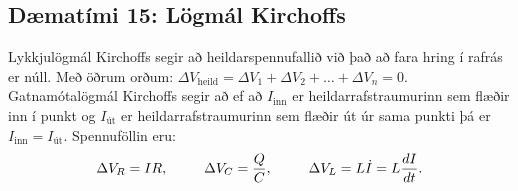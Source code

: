 \newpage

\subsection*{Dæmatími 15: Lögmál Kirchoffs}

\begin{tcolorbox}
Lykkjulögmál Kirchoffs segir að heildarspennufallið við það að fara hring í rafrás er núll. Með öðrum orðum: $\Delta V_{\text{heild}} = \Delta V_1 + \Delta V_2 + \ldots + \Delta V_n = 0$. Gatnamótalögmál Kirchoffs segir að ef að $I_{\text{inn}}$ er heildarrafstraumurinn sem flæðir inn í punkt og $I_{\text{út}}$ er heildarrafstraumurinn sem flæðir út úr sama punkti þá er $I_{\text{inn}} = I_{\text{út}}$. Spennuföllin eru:
\begin{align*}
    \Delta V_R = IR, \hspace{0.9cm} \Delta V_C = \frac{Q}{C}, \hspace{0.9cm} \Delta V_L = L \dot{I} = L \frac{dI}{dt}.
\end{align*}
\end{tcolorbox}

